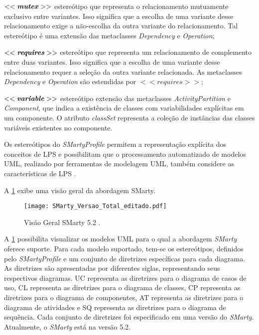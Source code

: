$<<\textbf{\textit{mutex}}>>$ estereótipo que representa o relacionamento mutuamente exclusivo entre variantes. Isso significa que a escolha de uma variante desse relacionamento exige a não-escolha da outra variante do relacionamento. Tal estereótipo é uma extensão das metaclasses \textit{Dependency} e \textit{Operation};

$<<\textbf{\textit{requires}}>>$ estereótipo que representa um relacionamento de complemento entre duas variantes. Isso significa que a escolha de uma variante desse relacionamento requer a seleção da outra variante relacionada. As metaclasses \textit{Dependency} e \textit{Operation} são estendidas por $<<\textit{requires}>>$;

$<<\textbf{\textit{variable}}>>$ estereótipo extensão das metaclasses \textit{ActivityPartition} e \textit{Component}, que indica a existência de classes com variabilidades explícitas em um componente. O atributo \textit{classSet} representa a coleção de instâncias das classes variáveis existentes no componente.

Os estereótipos do \textit{SMartyProfile} permitem a representação explícita dos conceitos de LPS e possibilitam que o processamento automatizado de modelos UML, realizado por ferramentas de modelagem UML, também considere as características de LPS \cite{LancelotiEtAl2013}.

A \ref{SMartyProfileVersoes} exibe uma visão geral da abordagem SMarty.

\begin{figure}[!htb]
	\centering		
	\caption{Visão Geral SMarty 5.2 \cite{Bera2015}.}	
	\label{SMartyProfileVersoes}
	\texttt{[image: SMarty\_Versao\_Total\_editado.pdf]}
\end{figure}

A \ref{SMartyProfileVersoes} possibilita visualizar os modelos UML para o qual a abordagem \textit{SMarty} oferece suporte. Para cada modelo suportado, tem-se os estereótipos, definidos pelo \textit{SMartyProfile} e um conjunto de diretrizes específicas para cada diagrama. As diretrizes são apresentadas por diferentes siglas, representando seus respectivos diagramas. UC representa as diretrizes para o diagrama de casos de uso, CL representa as diretrizes para o diagrama de classes, CP representa as diretrizes para o diagrama de componentes, AT representa as diretrizes para o diagrama de atividades e SQ representa as diretrizes para o diagrama de sequência. Cada conjunto de diretrizes foi especificado em uma versão do \textit{SMarty}. Atualmente, o \textit{SMarty} está na versão 5.2.

